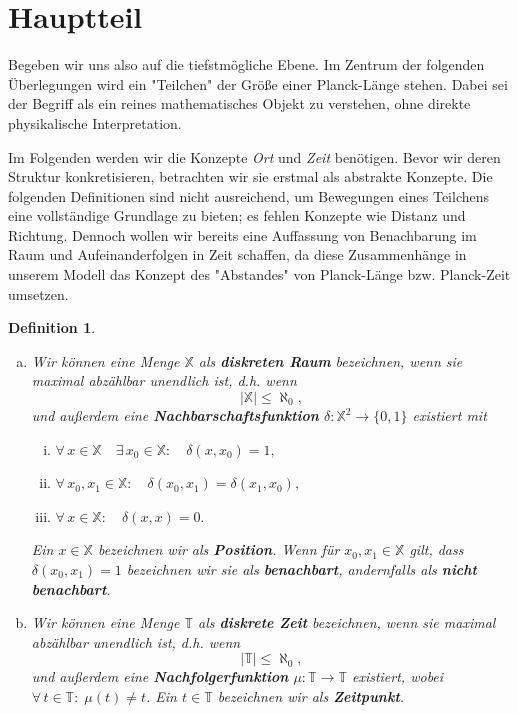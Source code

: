 \documentclass[a4paper,12pt,ngerman]{scrartcl}
\theoremstyle{plain}
\newtheorem{definition}{Definition}
\theoremstyle{plain}
\theoremstyle{plain}
\theoremstyle{plain}
\newcommand{\T}{\mathbb{T}}
\newcommand{\X}{\mathbb{X}}
\begin{document}
\section{Hauptteil}

Begeben wir uns also auf die tiefstmögliche Ebene. Im Zentrum der folgenden Überlegungen wird ein "Teilchen" der Größe einer Planck-Länge stehen. Dabei sei der Begriff als ein reines mathematisches Objekt zu verstehen, ohne direkte physikalische Interpretation.

Im Folgenden werden wir die Konzepte \textit{Ort} und \textit{Zeit} benötigen. Bevor wir deren Struktur konkretisieren, betrachten wir sie erstmal als abstrakte Konzepte. Die folgenden Definitionen sind nicht ausreichend, um Bewegungen eines Teilchens eine vollständige Grundlage zu bieten; es fehlen Konzepte wie Distanz und Richtung. Dennoch wollen wir bereits eine Auffassung von Benachbarung im Raum und Aufeinanderfolgen in Zeit schaffen, da diese Zusammenhänge in unserem Modell das Konzept des "Abstandes" von Planck-Länge bzw. Planck-Zeit umsetzen.

{
\begin{definition}\label{def_ortundzeit}
\begin{enumerate}[(a)]
	\item Wir können eine Menge $\X$ als \textbf{diskreten Raum} 	bezeichnen, wenn sie maximal abzählbar unendlich ist, d.h. 			wenn
	\[ |\X| \leq \aleph_0,\]
	und außerdem eine \textbf{Nachbarschaftsfunktion} $\delta: 			\X^2\rightarrow\{0,1\}$ existiert mit
	\begin{enumerate}[(i)]
		\item$\forall\, x\in\X\quad\exists\, x_0\in\X: \quad				\delta(x,x_0)=1,$
		\item$\forall\, x_0,x_1\in\X: \quad\delta(x_0,x_1)=					\delta(x_1,x_0),$ 
		\item$\forall\, x\in\X: \quad \delta(x,x)=0.$
	\end{enumerate}
	Ein $x\in\X$ bezeichnen wir als \textbf{Position}. Wenn für 		$x_0,x_1\in\X$ gilt, dass $\delta(x_0,x_1)=1$ bezeichnen wir 	sie als \textbf{benachbart}, andernfalls als \textbf{nicht 			benachbart}. 
	\item Wir können eine Menge $\T$ als \textbf{diskrete Zeit} 		bezeichnen, wenn sie maximal abzählbar unendlich ist, d.h. 			wenn
	\[ |\T| \leq \aleph_0,\]
	und außerdem eine \textbf{Nachfolgerfunktion} $\mu: \T 				\rightarrow \T$ existiert, wobei $\forall \,t\in\T: \;\mu(t)		\neq t$. Ein $t\in\T$ bezeichnen wir als \textbf{Zeitpunkt}.
\end{enumerate}
\end{definition} %
}
\end{document}
